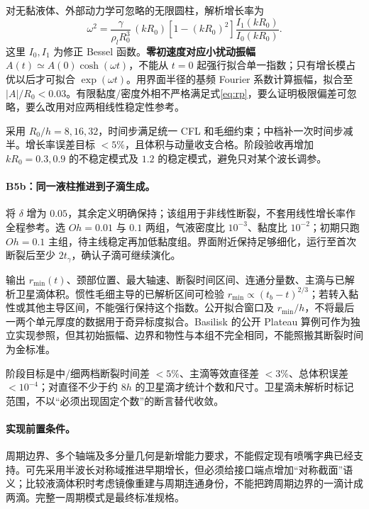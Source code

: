 \documentclass[11pt,a4paper]{article}
\begin{document}
对无黏液体、外部动力学可忽略的无限圆柱，解析增长率为\cite{mansour1990}
\begin{equation}\label{eq:rp}
\omega^2=\frac{\gamma}{\rho_lR_0^3}\,
(kR_0)\left[1-(kR_0)^2\right]\frac{I_1(kR_0)}{I_0(kR_0)}.
\end{equation}
这里 $I_0,I_1$ 为修正 Bessel 函数。\textbf{零初速度对应小扰动振幅 $A(t)\simeq A(0)\cosh(\omega t)$}，不能从 $t=0$ 起强行拟合单一指数；只有增长模占优以后才可拟合 $\exp(\omega t)$。用界面半径的基频 Fourier 系数计算振幅，拟合至 $|A|/R_0<0.03$。有限黏度/密度外相不严格满足式\eqref{eq:rp}，要么证明极限偏差可忽略，要么改用对应两相线性稳定性参考。

采用 $R_0/h=8,16,32$，时间步满足统一 CFL 和毛细约束；中档补一次时间步减半。增长率误差目标 $<5\%$，且体积与动量收支合格。阶段验收再增加 $kR_0=0.3,0.9$ 的不稳定模式及 $1.2$ 的稳定模式，避免只对某个波长调参。

\paragraph{B5b：同一液柱推进到子滴生成。}
将 $\delta$ 增为 $0.05$，其余定义明确保持；该组用于非线性断裂，不套用线性增长率作全程参考。选 $Oh=0.01$ 与 $0.1$ 两组，气液密度比 $10^{-3}$、黏度比 $10^{-2}$；初期只跑 $Oh=0.1$ 主组，待主线稳定再加低黏度组。界面附近保持足够细化，运行至首次断裂后至少 $2t_\gamma$，确认子滴可继续演化。

输出 $r_{\min}(t)$、颈部位置、最大轴速、断裂时间区间、连通分量数、主滴与已解析卫星滴体积。惯性毛细主导的已解析区间可检验 $r_{\min}\propto(t_b-t)^{2/3}$；若转入黏性或其他主导区间，不能强行保持这个指数。公开拟合窗口及 $r_{\min}/h$，不将最后一两个单元厚度的数据用于奇异标度拟合。Basilisk 的公开 Plateau 算例可作为独立实现参照\cite{basiliskplateau}，但其初始振幅、边界和物性与本组不完全相同，不能照搬其断裂时间为金标准。

阶段目标是中/细两档断裂时间差 $<5\%$、主滴等效直径差 $<3\%$、总体积误差 $<10^{-4}$；对直径不少于约 $8h$ 的卫星滴才统计个数和尺寸。卫星滴未解析时标记范围，不以“必须出现固定个数”的断言替代收敛。

\paragraph{实现前置条件。}
周期边界、多个轴端及多分量几何是新增能力要求，不能假定现有喷嘴字典已经支持。可先采用半波长对称域推进早期增长，但必须给接口端点增加“对称截面”语义；比较液滴体积时考虑镜像重建与周期连通身份，不能把跨周期边界的一滴计成两滴。完整一周期模式是最终标准规格。
\end{document}
